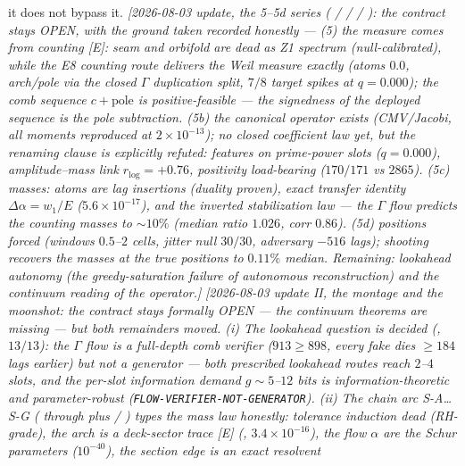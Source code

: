 \documentclass[11pt,a4paper]{article}
\begin{document}
it does not bypass it.  \emph{[2026-08-03 update, the 5--5d series
( /
 /  /
): the contract stays OPEN, with
the ground taken recorded honestly --- (5) the \emph{measure} comes
from counting [E]: seam and orbifold are dead as Z1 spectrum
(null-calibrated), while the E8 counting route delivers the Weil
measure exactly (atoms $0.0$, arch/pole via the closed $\Gamma$
duplication split, $7/8$ target spikes at $q=0.000$); the comb
sequence $c+\mathrm{pole}$ is positive-feasible --- the signedness of
the deployed sequence \emph{is} the pole subtraction.  (5b) the
canonical operator \emph{exists} (CMV/Jacobi, all moments reproduced
at $2\times10^{-13}$); no closed coefficient law yet, but the
renaming clause is explicitly refuted: features on prime-power slots
($q=0.000$), amplitude--mass link $r_{\log}=+0.76$, positivity
load-bearing ($170/171$ vs $2865$).  (5c) masses: atoms are
lag insertions (duality proven), exact transfer identity
$\Delta\alpha=w_1/E$ ($5.6\times10^{-17}$), and the \emph{inverted}
stabilization law --- the $\Gamma$ flow predicts the counting masses
to ${\sim}10\%$ (median ratio $1.026$, corr $0.86$).  (5d) positions
\emph{forced} (windows $0.5$--$2$ cells, jitter null $30/30$,
adversary $-516$ lags); shooting recovers the masses at the true
positions to $0.11\%$ median.  \emph{Remaining:} lookahead autonomy
(the greedy-saturation failure of autonomous reconstruction) and the
continuum reading of the operator.]}  \emph{[2026-08-03 update II,
the montage and the moonshot: the contract stays \emph{formally
OPEN} --- the continuum \emph{theorems} are missing --- but both
remainders moved.  (i) The lookahead question is \emph{decided}
(, $13/13$): the $\Gamma$ flow is a
full-depth comb \emph{verifier} ($913\ge898$, every fake dies
$\ge184$ lags earlier) but \emph{not} a generator --- both prescribed
lookahead routes reach $2$--$4$ slots, and the per-slot information
demand $g\sim5$--$12$ bits is information-theoretic and
parameter-robust (\texttt{FLOW-VERIFIER-NOT-GENERATOR}).  (ii) The
chain arc S-A\ldots S-G (
through  plus
 /
) types the mass law
honestly: tolerance induction dead (RH-grade), the arch is a
deck-sector trace [E] (,
$3.4\times10^{-16}$), the flow $\alpha$ \emph{are} the Schur
parameters ($10^{-40}$), the section edge is an exact resolvent
}
\end{document}
